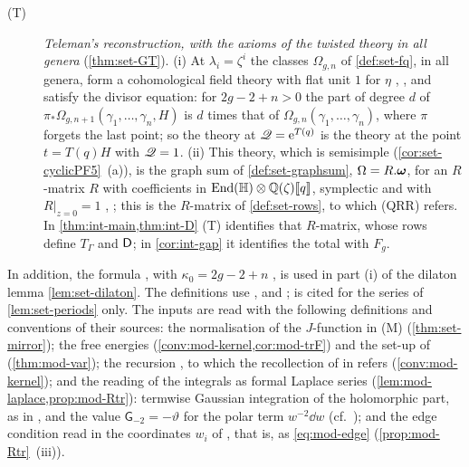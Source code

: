 \begin{description}
\item[(T)] \emph{Teleman's reconstruction, with the axioms of the twisted theory in all genera} (\cref{thm:set-GT}). (i) At $\lambda_i=\zeta^i$ the classes $\Omega_{g,n}$ of \cref{def:set-fq}, in all genera, form a cohomological field theory with flat unit $1$ for $\eta$ \cite[\S4.1]{GJR18}, \cite[Def.~0.3]{PPZ15}, and satisfy the divisor equation: for $2g-2+n>0$ the part of degree $d$ of $\pi_*\Omega_{g,n+1}(\gamma_1,\dots,\gamma_n,H)$ is $d$ times that of $\Omega_{g,n}(\gamma_1,\dots,\gamma_n)$, where $\pi$ forgets the last point; so the theory at $\mathscr{Q}=\mathrm{e}^{T(q)}$ is the theory at the point $t=T(q)H$ with $\mathscr{Q}=1$. (ii) This theory, which is semisimple (\cref{cor:set-cyclicPF5}~(a)), is the graph sum of \cref{def:set-graphsum}, $\Omega=R.\boldsymbol{\omega}$, for an $R$-matrix $R$ with coefficients in $\operatorname{End}(\mathbb{H})\otimes\mathbb{Q}(\zeta)[\![ q ]\!]$, symplectic and with $R|_{z=0}=1$ \cite[Theorem~(2) in (1.15)]{MR2917177}, \cite[\S4.1, Theorem~4.1]{GJR18}; this is the $R$-matrix of \cref{def:set-rows}, to which (QRR) refers. In \cref{thm:int-main,thm:int-D} (T) identifies that $R$-matrix, whose rows define $T_\Gamma$ and $\mathsf{D}$; in \cref{cor:int-gap} it identifies the total with $F_g$.
\end{description}
In addition, the formula \cite[(1.7)]{AC96}, with $\kappa_0=2g-2+n$ \cite[p.~5]{AC96}, is used in part (i) of the dilaton lemma \cref{lem:set-dilaton}. The definitions use \cite[\S0.2, (5)]{LP18}, \cite[\S0.2, (5), (10)]{LP20} and \cite{MR1666787}; \cite{ZZ08} is cited for the series of \cref{lem:set-periods} only. The inputs are read with the following definitions and conventions of their sources: the normalisation of the $J$-function \cite[Section~6, (10)]{MR2276766} in (M) (\cref{thm:set-mirror}); the free energies \cite[Def.~4.3, (4-10)]{Eynard:2007kz} (\cref{conv:mod-kernel,cor:mod-trF}) and the set-up \cite[(5-1), the assumption before (5-4), (5-13)]{Eynard:2007kz} of \cite[Theorem~5.1]{Eynard:2007kz} (\cref{thm:mod-var}); the recursion \cite[(2-26)--(2-29)]{Dunin-Barkowski:2015caa}, to which the recollection of \cite[Theorem~4.1]{DuninBarkowski:2012bw} in \cite[\S2.6]{Dunin-Barkowski:2015caa} refers (\cref{conv:mod-kernel}); and the reading of the integrals \cite[(2-31), (2-32)]{Dunin-Barkowski:2015caa} as formal Laplace series (\cref{lem:mod-laplace,prop:mod-Rtr}): termwise Gaussian integration of the holomorphic part, as in \cite[(3-57)]{DuninBarkowski:2012bw}, and the value $\mathsf G_{-2}=-\vartheta$ for the polar term $w^{-2}\dd w$ (cf.\ \cite[(3-64)]{DuninBarkowski:2012bw}); and the edge condition \cite[(4-1)]{DuninBarkowski:2012bw} read in the coordinates $w_i$ of \cite[\S2.6]{Dunin-Barkowski:2015caa}, that is, as \eqref{eq:mod-edge} (\cref{prop:mod-Rtr}~(iii)).


